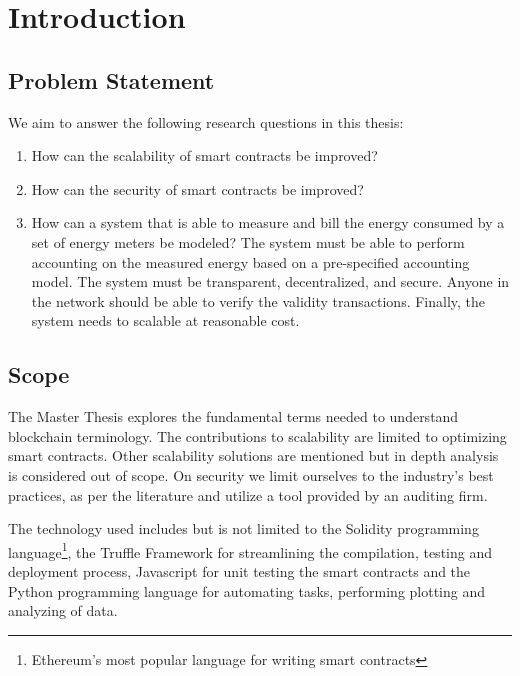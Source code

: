 \chapter{Introduction}

\section{Problem Statement}
We aim to answer the following research questions in this thesis:

\begin{enumerate}
    \item How can the scalability of smart contracts be improved?
    \item How can the security of smart contracts be improved?
    \item How can a system that is able to measure and bill the energy consumed by a set of energy meters be modeled? The system must be able to perform accounting on the measured energy based on a pre-specified accounting model. The system must be transparent, decentralized, and secure. Anyone in the network should be able to verify the validity transactions. Finally, the system needs to scalable at reasonable cost.
\end{enumerate}

\section{Scope}
The Master Thesis explores the fundamental terms needed to understand blockchain terminology. The contributions to scalability are limited to optimizing smart contracts. Other scalability solutions are mentioned but in depth analysis is considered out of scope. On security we limit ourselves to the industry's best practices, as per the literature and utilize a tool provided by an auditing firm.

The technology used includes but is not limited to the Solidity programming language\footnote{Ethereum's most popular language for writing smart contracts}, the Truffle Framework for streamlining the compilation, testing and deployment process, Javascript for unit testing the smart contracts and the Python programming language for automating tasks, performing plotting and analyzing of data.

